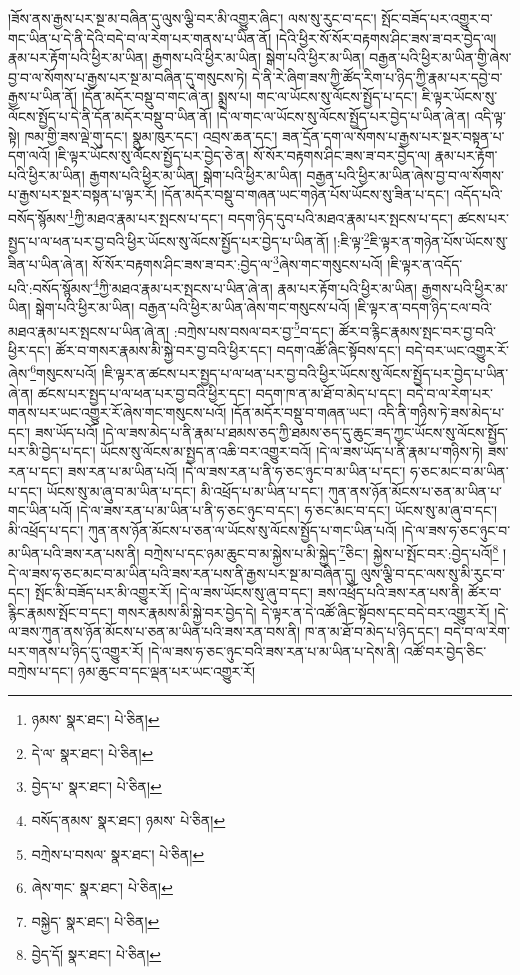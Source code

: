 །ཟོས་ནས་རྒྱས་པར་སྔ་མ་བཞིན་དུ་ལུས་ལྕི་བར་མི་འགྱུར་ཞིང་། ལས་སུ་རུང་བ་དང་། སྤོང་བཟོད་པར་འགྱུར་བ་གང་ཡིན་པ་དེ་ནི་དེའི་བདེ་བ་ལ་རེག་པར་གནས་པ་ཡིན་ནོ། །དེའི་ཕྱིར་སོ་སོར་བརྟགས་ཤིང་ཟས་ཟ་བར་བྱེད་ལ། རྣམ་པར་རྟོག་པའི་ཕྱིར་མ་ཡིན། རྒྱགས་པའི་ཕྱིར་མ་ཡིན། སྒེག་པའི་ཕྱིར་མ་ཡིན། བརྒྱན་པའི་ཕྱིར་མ་ཡིན་གྱི་ཞེས་བྱ་བ་ལ་སོགས་པ་རྒྱས་པར་སྔ་མ་བཞིན་དུ་གསུངས་ཏེ། དེ་ནི་རེ་ཞིག་ཟས་ཀྱི་ཚོད་རིག་པ་ཉིད་ཀྱི་རྣམ་པར་དབྱེ་བ་རྒྱས་པ་ཡིན་ནོ། །དོན་མདོར་བསྡུ་བ་གང་ཞེ་ན། སྨྲས་པ། གང་ལ་ཡོངས་སུ་ལོངས་སྤྱོད་པ་དང་། ཇི་ལྟར་ཡོངས་སུ་ལོངས་སྤྱོད་པ་དེ་ནི་དོན་མདོར་བསྡུ་བ་ཡིན་ནོ། །དེ་ལ་གང་ལ་ཡོངས་སུ་ལོངས་སྤྱོད་པར་བྱེད་པ་ཡིན་ཞེ་ན། འདི་ལྟ་སྟེ། ཁམ་གྱི་ཟས་ལྡེ་གུ་དང་། སྣུམ་ཁུར་དང་། འབྲས་ཆན་དང་། ཟན་དྲོན་དག་ལ་སོགས་པ་རྒྱས་པར་སྔར་བསྟན་པ་དག་ལའོ། །ཇི་ལྟར་ཡོངས་སུ་ལོངས་སྤྱོད་པར་བྱེད་ཅེ་ན། སོ་སོར་བརྟགས་ཤིང་ཟས་ཟ་བར་བྱེད་ལ། རྣམ་པར་རྟོག་པའི་ཕྱིར་མ་ཡིན། རྒྱགས་པའི་ཕྱིར་མ་ཡིན། སྒེག་པའི་ཕྱིར་མ་ཡིན། བརྒྱན་པའི་ཕྱིར་མ་ཡིན་ཞེས་བྱ་བ་ལ་སོགས་པ་རྒྱས་པར་སྔར་བསྟན་པ་ལྟར་རོ། །དོན་མདོར་བསྡུ་བ་གཞན་ཡང་གཉེན་པོས་ཡོངས་སུ་ཟིན་པ་དང་། འདོད་པའི་བསོད་སྙོམས་\footnote{ཉམས་  སྣར་ཐང་།  པེ་ཅིན། }ཀྱི་མཐའ་རྣམ་པར་སྤངས་པ་དང་། བདག་ཉིད་དུབ་པའི་མཐའ་རྣམ་པར་སྤངས་པ་དང་། ཚངས་པར་སྤྱད་པ་ལ་ཕན་པར་བྱ་བའི་ཕྱིར་ཡོངས་སུ་ལོངས་སྤྱོད་པར་བྱེད་པ་ཡིན་ནོ། །:ཇི་ལྟ་\footnote{དེ་ལ་  སྣར་ཐང་།  པེ་ཅིན། }ཇི་ལྟར་ན་གཉེན་པོས་ཡོངས་སུ་ཟིན་པ་ཡིན་ཞེ་ན། སོ་སོར་བརྟགས་ཤིང་ཟས་ཟ་བར་:བྱེད་ལ་\footnote{བྱེད་པ་  སྣར་ཐང་།  པེ་ཅིན། }ཞེས་གང་གསུངས་པའོ། །ཇི་ལྟར་ན་འདོད་པའི་:བསོད་སྙོམས་\footnote{བསོད་ནམས་  སྣར་ཐང་། ཉམས་  པེ་ཅིན། }ཀྱི་མཐའ་རྣམ་པར་སྤངས་པ་ཡིན་ཞེ་ན། རྣམ་པར་རྟོག་པའི་ཕྱིར་མ་ཡིན། རྒྱགས་པའི་ཕྱིར་མ་ཡིན། སྒེག་པའི་ཕྱིར་མ་ཡིན། བརྒྱན་པའི་ཕྱིར་མ་ཡིན་ཞེས་གང་གསུངས་པའོ། །ཇི་ལྟར་ན་བདག་ཉིད་ངལ་བའི་མཐའ་རྣམ་པར་སྤངས་པ་ཡིན་ཞེ་ན། :བཀྲེས་པས་བསལ་བར་བྱ་\footnote{བཀྲེས་པ་བསལ་  སྣར་ཐང་།  པེ་ཅིན། }བ་དང་། ཚོར་བ་རྙིང་རྣམས་སྤང་བར་བྱ་བའི་ཕྱིར་དང་། ཚོར་བ་གསར་རྣམས་མི་སྐྱེ་བར་བྱ་བའི་ཕྱིར་དང་། བདག་འཚོ་ཞིང་སྟོབས་དང་། བདེ་བར་ཡང་འགྱུར་རོ་ཞེས་\footnote{ཞེས་གང་  སྣར་ཐང་།  པེ་ཅིན། }གསུངས་པའོ། །ཇི་ལྟར་ན་ཚངས་པར་སྤྱད་པ་ལ་ཕན་པར་བྱ་བའི་ཕྱིར་ཡོངས་སུ་ལོངས་སྤྱོད་པར་བྱེད་པ་ཡིན་ཞེ་ན། ཚངས་པར་སྤྱད་པ་ལ་ཕན་པར་བྱ་བའི་ཕྱིར་དང་། བདག་ཁ་ན་མ་ཐོ་བ་མེད་པ་དང་། བདེ་བ་ལ་རེག་པར་གནས་པར་ཡང་འགྱུར་རོ་ཞེས་གང་གསུངས་པའོ། །དོན་མདོར་བསྡུ་བ་གཞན་ཡང་། འདི་ནི་གཉིས་ཏེ་ཟས་མེད་པ་དང་། ཟས་ཡོད་པའོ། །དེ་ལ་ཟས་མེད་པ་ནི་རྣམ་པ་ཐམས་ཅད་ཀྱི་ཐམས་ཅད་དུ་ཆུང་ཟད་ཀྱང་ཡོངས་སུ་ལོངས་སྤྱོད་པར་མི་བྱེད་པ་དང་། ཡོངས་སུ་ལོངས་མ་སྤྱད་ན་འཆི་བར་འགྱུར་བའོ། །དེ་ལ་ཟས་ཡོད་པ་ནི་རྣམ་པ་གཉིས་ཏེ། ཟས་རན་པ་དང་། ཟས་རན་པ་མ་ཡིན་པའོ། །དེ་ལ་ཟས་རན་པ་ནི་ཧ་ཅང་ཉུང་བ་མ་ཡིན་པ་དང་། ཧ་ཅང་མང་བ་མ་ཡིན་པ་དང་། ཡོངས་སུ་མ་ཞུ་བ་མ་ཡིན་པ་དང་། མི་འཕྲོད་པ་མ་ཡིན་པ་དང་། ཀུན་ནས་ཉོན་མོངས་པ་ཅན་མ་ཡིན་པ་གང་ཡིན་པའོ། །དེ་ལ་ཟས་རན་པ་མ་ཡིན་པ་ནི་ཧ་ཅང་ཉུང་བ་དང་། ཧ་ཅང་མང་བ་དང་། ཡོངས་སུ་མ་ཞུ་བ་དང་། མི་འཕྲོད་པ་དང་། ཀུན་ནས་ཉོན་མོངས་པ་ཅན་ལ་ཡོངས་སུ་ལོངས་སྤྱོད་པ་གང་ཡིན་པའོ། །དེ་ལ་ཟས་ཧ་ཅང་ཉུང་བ་མ་ཡིན་པའི་ཟས་རན་པས་ནི། བཀྲེས་པ་དང་ཉམ་ཆུང་བ་མ་སྐྱེས་པ་མི་སྐྱེད་\footnote{བསྐྱེད་  སྣར་ཐང་།  པེ་ཅིན། }ཅིང་། སྐྱེས་པ་སྤོང་བར་:བྱེད་པའོ།\footnote{བྱེད་དོ།  སྣར་ཐང་།  པེ་ཅིན། } །དེ་ལ་ཟས་ཧ་ཅང་མང་བ་མ་ཡིན་པའི་ཟས་རན་པས་ནི་རྒྱས་པར་སྔ་མ་བཞིན་དུ། ལུས་ལྕི་བ་དང་ལས་སུ་མི་རུང་བ་དང་། སྤོང་མི་བཟོད་པར་མི་འགྱུར་རོ། །དེ་ལ་ཟས་ཡོངས་སུ་ཞུ་བ་དང་། ཟས་འཕྲོད་པའི་ཟས་རན་པས་ནི། ཚོར་བ་རྙིང་རྣམས་སྤོང་བ་དང་། གསར་རྣམས་མི་སྐྱེ་བར་བྱེད་དེ། དེ་ལྟར་ན་དེ་འཚོ་ཞིང་སྟོབས་དང་བདེ་བར་འགྱུར་རོ། །དེ་ལ་ཟས་ཀུན་ནས་ཉོན་མོངས་པ་ཅན་མ་ཡིན་པའི་ཟས་རན་བས་ནི། ཁ་ན་མ་ཐོ་བ་མེད་པ་ཉིད་དང་། བདེ་བ་ལ་རེག་པར་གནས་པ་ཉིད་དུ་འགྱུར་རོ། །དེ་ལ་ཟས་ཧ་ཅང་ཉུང་བའི་ཟས་རན་པ་མ་ཡིན་པ་དེས་ནི། འཚོ་བར་བྱེད་ཅིང་བཀྲེས་པ་དང་། ཉམ་ཆུང་བ་དང་ལྡན་པར་ཡང་འགྱུར་རོ། 